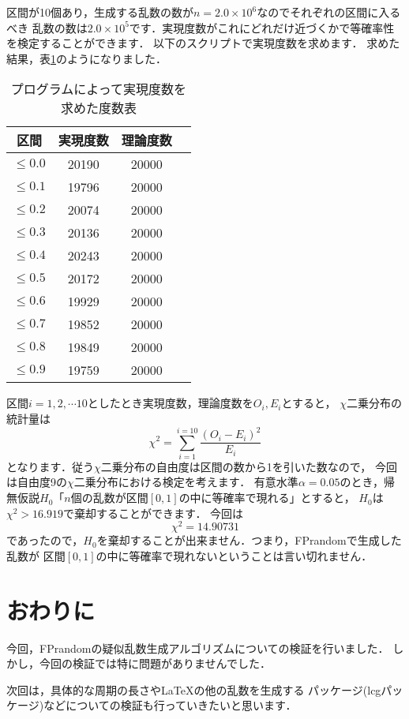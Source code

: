 区間が10個あり，生成する乱数の数が$n = 2.0 \times 10^6$なのでそれぞれの区間に入るべき
乱数の数は$2.0\times 10^5$です．実現度数がこれにどれだけ近づくかで等確率性を検定することができます．
以下のスクリプトで実現度数を求めます．
{
}
求めた結果，表\ref{tab:freq_result}のようになりました．
\begin{table}[htbp]
\centering
\caption{プログラムによって実現度数を求めた度数表}
\label{tab:freq_result}
\begin{tabular}{|c|c|c|c|}
\hline
区間            & 実現度数 & 理論度数 \\ \hline
$\leq 0.0$ &   20190   &  20000  \\ \hline
$\leq 0.1$ &   19796   &  20000  \\ \hline
$\leq 0.2$ &   20074   &  20000  \\ \hline
$\leq 0.3$ &   20136   &  20000  \\ \hline
$\leq 0.4$ &   20243   &  20000  \\ \hline
$\leq 0.5$ &   20172   &  20000  \\ \hline
$\leq 0.6$ &   19929   &  20000  \\ \hline
$\leq 0.7$ &   19852   &  20000  \\ \hline
$\leq 0.8$ &   19849   &  20000  \\ \hline
$\leq 0.9$ &   19759   &  20000  \\ \hline
\end{tabular}
\end{table}
区間$i = 1,2,\cdots10$としたとき実現度数，理論度数を$O_i,E_i$とすると，
$\chi$二乗分布の統計量は
\[
\chi^2 = \sum_{i=1}^{i = 10}\dfrac{(O_i - E_i)^2}{E_i}
\]
となります．従う$\chi$二乗分布の自由度は区間の数から1を引いた数なので，
今回は自由度9の$\chi$二乗分布における検定を考えます．
有意水準$\alpha = 0.05$のとき，帰無仮説$H_0$「$n$個の乱数が区間$[0,1]$の中に等確率で現れる」とすると，
$H_0$は$\chi^2 > 16.919$で棄却することができます．
今回は
\[
\chi^2 = 14.90731
\]
であったので，$H_0$を棄却することが出来ません．つまり，FPrandomで生成した乱数が
区間$[0,1]$の中に等確率で現れないということは言い切れません．

\section{おわりに}
今回，FPrandomの疑似乱数生成アルゴリズムについての検証を行いました．
しかし，今回の検証では特に問題がありませんでした．

次回は，具体的な周期の長さや\LaTeX の他の乱数を生成する
パッケージ(lcgパッケージ)などについての検証も行っていきたいと思います．

